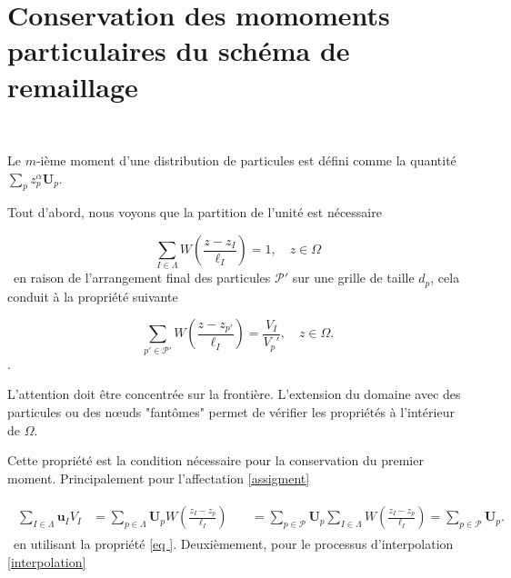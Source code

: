 
\section{Conservation des momoments particulaires du schéma de remaillage}~\label{appendix:moment_conservation}

Le $m$-ième moment d'une distribution de particules est défini comme la quantité $\sum_{p} z_p^{\alpha} \bm{U}_p$.

Tout d'abord, nous voyons que la partition de l'unité est nécessaire

\begin{equation}~\label{eq
    }
    \sum_{I \in \Lambda} W\left(\frac{z - z_I}{\ell_I}\right) = 1 ,\quad z \in \Omega
\end{equation}~en raison de l'arrangement final des particules $\mathcal{P'}$ sur une grille de taille $d_p$, cela conduit à la propriété suivante

\begin{equation}~\label{eq
    }
    \sum_{p'\in\mathcal P'} W\left(\frac{z - z_{p'}}{\ell_I}\right) = \frac{V_I}{V_p'},\quad z \in \Omega.
\end{equation}.

L'attention doit être concentrée sur la frontière. L'extension du domaine avec des particules ou des nœuds "fantômes" permet de vérifier les propriétés à l'intérieur de $\Omega$.

Cette propriété est la condition nécessaire pour la conservation du premier moment. Principalement pour l'affectation \ref{assigment}

\begin{gather}
    \begin{align*}
        \sum_{I \in \Lambda} \bm u_I V_I & = \sum_{p \in \Lambda} \bm U_p W \left(\frac{z_I - z_p}{\ell_I} \right)                                                            & \
                                         & = \sum_{p \in \mathcal P} \bm U_p \sum_{I \in \Lambda} W \left(\frac{z_I - z_p}{\ell_I} \right) = \sum_{p \in \mathcal P} \bm U_p. &
    \end{align*}
\end{gather}~en utilisant la propriété \eqref{eq
}. Deuxièmement, pour le processus d'interpolation \ref{interpolation}

